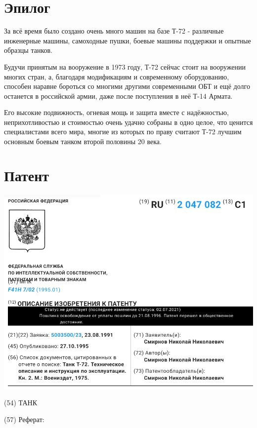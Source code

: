 \section{Эпилог}

	За всё время было создано очень много машин на базе Т-72 - различные инженерные машины, самоходные пушки, боевые машины поддержки и опытные образцы танков.

Будучи принятым на вооружение в 1973 году, Т-72 сейчас стоит на вооружении многих стран, а, благодаря модификациям и современному оборудованию, способен наравне бороться со многими другими современными ОБТ и ещё долго останется в российской армии, даже после поступления в неё Т-14 Армата.

Его высокие подвижность, огневая мощь и защита вместе с надёжностью, неприхотливостью и стоимостью очень удачно собраны в одно целое, что ценится специалистами всего мира, многие из которых по праву считают Т-72 лучшим основным боевым танком второй половины 20 века.

\section{Патент}

    \begin{center}
	\includegraphics[width=1\textwidth]{images/tank3.jpg}
    \end{center}

    (54) ТАНК

(57) Реферат:

